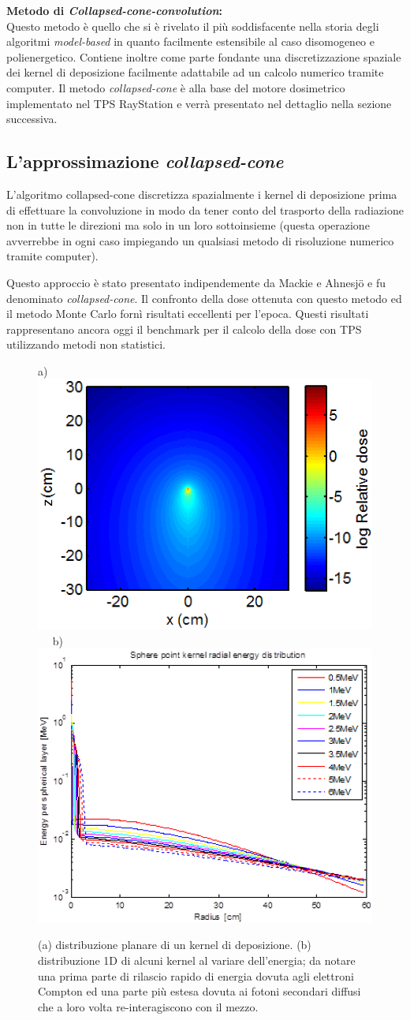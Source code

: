 {\textbf{Metodo di \textit{Collapsed-cone-convolution}:\\}
Questo metodo è quello che si è rivelato il più soddisfacente nella storia degli algoritmi \textit{model-based} in quanto facilmente estensibile al caso disomogeneo e polienergetico. Contiene inoltre come parte fondante una discretizzazione spaziale dei kernel di deposizione facilmente adattabile ad un calcolo numerico tramite computer. Il metodo \textit{collapsed-cone} è alla base del motore dosimetrico implementato nel TPS RayStation e verrà presentato nel dettaglio nella sezione successiva.


\subsection{L'approssimazione \textit{collapsed-cone}}
L'algoritmo collapsed-cone discretizza spazialmente i kernel di deposizione prima di effettuare la convoluzione in modo da tener conto del trasporto della radiazione non in tutte le direzioni ma solo in un loro sottoinsieme (questa operazione avverrebbe in ogni caso impiegando un qualsiasi metodo di risoluzione numerico tramite computer).

Questo approccio è stato presentato indipendemente da Mackie \cite{Reckwerdt1992} e Ahnesj\"{o} \cite{Ahnesjo1989} e fu denominato \textit{collapsed-cone}. Il confronto della dose ottenuta con questo metodo ed il metodo Monte Carlo fornì risultati eccellenti per l'epoca. Questi risultati rappresentano ancora oggi il benchmark per il calcolo della dose con TPS utilizzando metodi non statistici.
\begin{figure}[!t]
\centering
a) \includegraphics[width=.42\textwidth]{./cap1/kern_ray1.png}$\quad$
b) \includegraphics[width=.42\textwidth]{./cap1/kern_ray2.png}
\caption{(a) distribuzione planare di un kernel di deposizione. (b) distribuzione 1D di alcuni kernel al variare dell'energia; da notare una prima parte di rilascio rapido di energia dovuta agli elettroni Compton ed una parte più estesa dovuta ai fotoni secondari diffusi che a loro volta re-interagiscono con il mezzo.}
\label{fig:kern_ray}
\end{figure}

}
